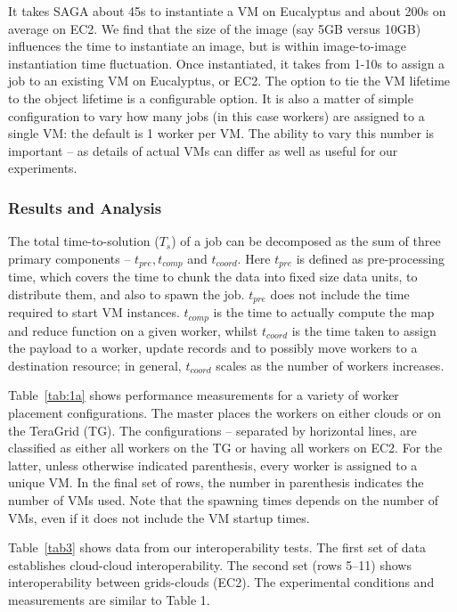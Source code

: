 \documentclass[3p,twocolumn]{elsarticle}
\begin{document}
It takes SAGA about 45s to instantiate a VM on Eucalyptus and about
200s on average on EC2.  We find that the size of the image (say 5GB
versus 10GB) influences the time to instantiate an image, but is
within image-to-image instantiation time fluctuation.  Once
instantiated, it takes from 1-10s to assign a job to an existing VM on
Eucalyptus, or EC2.  The option to tie the VM lifetime to the
 object lifetime is a configurable option.  It
is also a matter of simple configuration to vary how many jobs (in
this case workers) are assigned to a single VM:  the default is 1
worker per VM.  The ability to vary this number is important -- as
details of actual VMs can differ as well as useful for our
experiments.


\subsubsection*{Results and Analysis}

The total time-to-solution ($T_s$) of a \sagamapreduce job can be
decomposed as the sum of three primary components -- $t_{pre},
t_{comp}$ and $t_{coord}$.  Here $t_{pre}$ is defined as
pre-processing time, which covers the time to chunk the data into
fixed size data units, to distribute them, and also to spawn the job.
$t_{pre}$ does not include the time required to start VM instances.
$t_{comp}$ is the time to actually compute the map and reduce function
on a given worker, whilst $t_{coord}$ is the time taken to assign the
payload to a worker, update records and to possibly move workers to a
destination resource; in general, $t_{coord}$ scales as the number of
workers increases.

Table~\ref{tab:1a} shows performance measurements for a variety of
worker placement configurations.  The master places the workers on
either clouds or on the TeraGrid (TG). The configurations -- separated
by horizontal lines, are classified as either all workers on the TG or
having all workers on EC2. For the latter, unless otherwise indicated
parenthesis, every worker is assigned to a unique VM. In the final set
of rows, the number in parenthesis indicates the number of VMs used.
Note that the spawning times depends on the number of VMs, even if it
does not include the VM startup times.


Table~\ref{tab3} shows data from our interoperability tests.  The
first set of data establishes cloud-cloud interoperability. The second
set (rows 5--11) shows interoperability between grids-clouds (EC2).
The experimental conditions and measurements are similar to Table 1.
\end{document}
